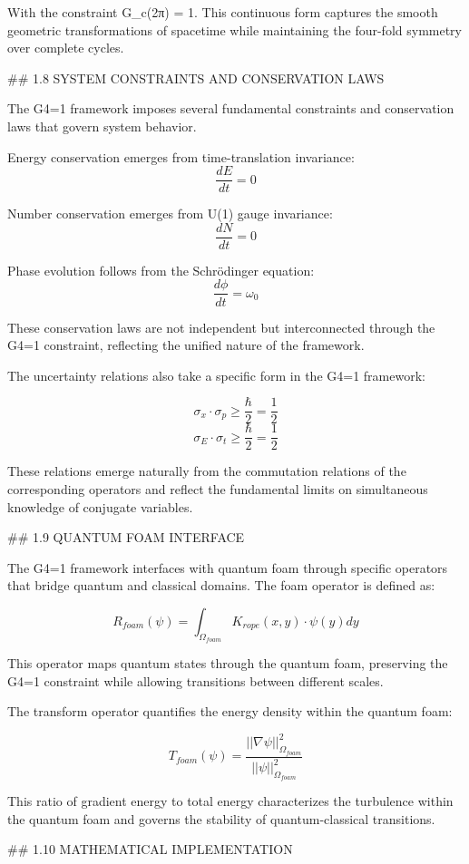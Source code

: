 With the constraint G_c(2π) = 1. This continuous form captures the smooth geometric transformations of spacetime while maintaining the four-fold symmetry over complete cycles.

## 1.8 SYSTEM CONSTRAINTS AND CONSERVATION LAWS

The G4=1 framework imposes several fundamental constraints and conservation laws that govern system behavior.

Energy conservation emerges from time-translation invariance:
$$\frac{dE}{dt} = 0$$

Number conservation emerges from U(1) gauge invariance:
$$\frac{dN}{dt} = 0$$

Phase evolution follows from the Schrödinger equation:
$$\frac{d\phi}{dt} = \omega_0$$

These conservation laws are not independent but interconnected through the G4=1 constraint, reflecting the unified nature of the framework.

The uncertainty relations also take a specific form in the G4=1 framework:

$$\sigma_x \cdot \sigma_p \geq \frac{\hbar}{2} = \frac{1}{2}$$
$$\sigma_E \cdot \sigma_t \geq \frac{\hbar}{2} = \frac{1}{2}$$

These relations emerge naturally from the commutation relations of the corresponding operators and reflect the fundamental limits on simultaneous knowledge of conjugate variables.

## 1.9 QUANTUM FOAM INTERFACE

The G4=1 framework interfaces with quantum foam through specific operators that bridge quantum and classical domains. The foam operator is defined as:

$$R_{foam}(\psi) = \int_{\Omega_{foam}} K_{rope}(x,y) \cdot \psi(y)dy$$

This operator maps quantum states through the quantum foam, preserving the G4=1 constraint while allowing transitions between different scales.

The transform operator quantifies the energy density within the quantum foam:

$$T_{foam}(\psi) = \frac{||\nabla\psi||^2_{\Omega_{foam}}}{||\psi||^2_{\Omega_{foam}}}$$

This ratio of gradient energy to total energy characterizes the turbulence within the quantum foam and governs the stability of quantum-classical transitions.

## 1.10 MATHEMATICAL IMPLEMENTATION

